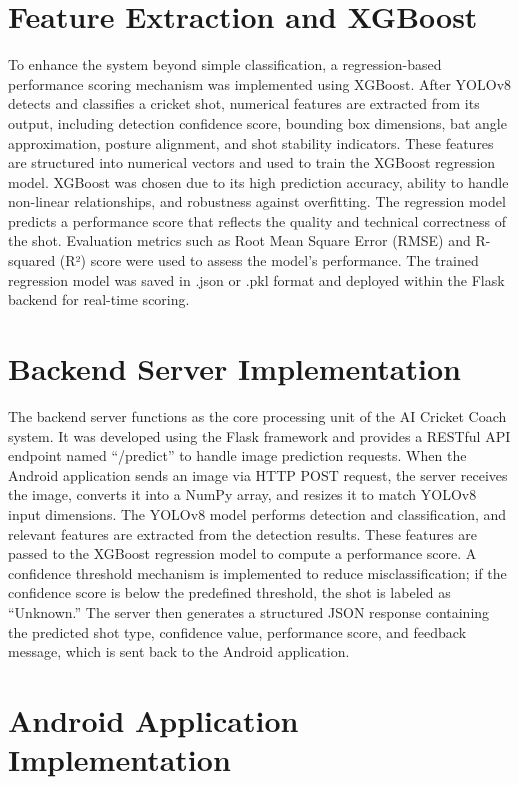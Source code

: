 \section{Feature Extraction and XGBoost} \label{S6.4}

To enhance the system beyond simple classification, a regression-based performance scoring mechanism was implemented using XGBoost. After YOLOv8 detects and classifies a cricket shot, numerical features are extracted from its output, including detection confidence score, bounding box dimensions, bat angle approximation, posture alignment, and shot stability indicators. These features are structured into numerical vectors and used to train the XGBoost regression model. XGBoost was chosen due to its high prediction accuracy, ability to handle non-linear relationships, and robustness against overfitting. The regression model predicts a performance score that reflects the quality and technical correctness of the shot. Evaluation metrics such as Root Mean Square Error (RMSE) and R-squared (R²) score were used to assess the model’s performance. The trained regression model was saved in .json or .pkl format and deployed within the Flask backend for real-time scoring.

\section{Backend Server Implementation} \label{S6.5}

The backend server functions as the core processing unit of the AI Cricket Coach system. It was developed using the Flask framework and provides a RESTful API endpoint named “/predict” to handle image prediction requests. When the Android application sends an image via HTTP POST request, the server receives the image, converts it into a NumPy array, and resizes it to match YOLOv8 input dimensions. The YOLOv8 model performs detection and classification, and relevant features are extracted from the detection results. These features are passed to the XGBoost regression model to compute a performance score. A confidence threshold mechanism is implemented to reduce misclassification; if the confidence score is below the predefined threshold, the shot is labeled as “Unknown.” The server then generates a structured JSON response containing the predicted shot type, confidence value, performance score, and feedback message, which is sent back to the Android application.

\section{Android Application Implementation} \label{S6.6}

